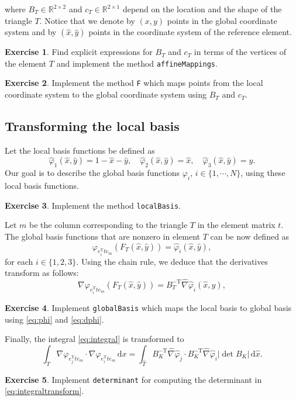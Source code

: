 \documentclass{amsart}
\theoremstyle{definition}
\newtheorem{exercise}{\color{red}Exercise}
\begin{document}
where $B_T \in \mathbb{R}^{2 \times 2}$ and $c_T \in \mathbb{R}^{2 \times 1}$
depend on the location and the shape of the triangle $T$.
Notice that we denote by $(x,y)$ points in the global
coordinate system and by $(\widehat{x},\widehat{y})$ points in the
coordinate system of the reference element.
\begin{exercise}
  Find explicit expressions for $B_T$ and $c_T$ in terms of the
vertices of the element $T$ and implement the method \verb|affineMappings|.
\end{exercise}
\begin{exercise}
  Implement the method \verb|F| which maps points from the local coordinate
  system to the global coordinate system using $B_T$ and $c_T$.
\end{exercise}
\subsection{Transforming the local basis}
Let the local basis functions be defined as
\begin{equation}
  \widehat{\varphi}_1(\widehat{x},\widehat{y}) = 1 - \widehat{x} - \widehat{y}, \quad \widehat{\varphi}_2(\widehat{x},\widehat{y}) = \widehat{x}, \quad \widehat{\varphi}_3(\widehat{x},\widehat{y}) = \widehat{y}.
\end{equation}
Our goal is to describe the global basis functions $\varphi_i$,
$i\in\{1,\cdots,N\}$, using these local basis functions.
\begin{exercise}
  Implement the method \verb|localBasis|.
\end{exercise}
Let $m$ be the column corresponding to the triangle $T$ in the element
matrix $t$. The global basis functions that are nonzero in element $T$
can be now defined as
\begin{equation}
  \label{eq:phi}
  \varphi_{e_i^{\mathrm{T}}te_m}(F_T(\widehat{x},\widehat{y}))= \widehat{\varphi}_i(\widehat{x},\widehat{y}),
\end{equation}
for each $i \in \{1,2,3\}$. Using the chain rule, we deduce that the
derivatives transform as follows:
\begin{equation}
  \label{eq:dphi}
  \nabla \varphi_{e_i^{\mathrm{T}}te_m}(F_T(\widehat{x},\widehat{y})) = B_T^{-\mathrm{T}} \widehat{\nabla} \widehat{\varphi}_i(\widehat{x},\widehat{y}),
\end{equation}
\begin{exercise}
  Implement \verb|globalBasis| which maps the local basis to global
basis using \eqref{eq:phi} and \eqref{eq:dphi}.
\end{exercise}
Finally, the integral \eqref{eq:integral} is transformed to
\begin{equation}
  \label{eq:integraltransform}
    \int_T \nabla \varphi_{e_j^{\mathrm{T}}te_m} \cdot \nabla \varphi_{e_i^{\mathrm{T}}te_m}\,\mathrm{d}x = \int_{\widehat{T}} B_K^{-\mathrm{T}}\widehat{\nabla} \widehat{\varphi}_j \cdot B_K^{-\mathrm{T}}\widehat{\nabla}\widehat{\varphi}_i|\det B_K|\,\mathrm{d}\widehat{x}.
\end{equation}
\begin{exercise}
  Implement \verb|determinant| for computing the determinant in \eqref{eq:integraltransform}.
\end{exercise}
\end{document}
